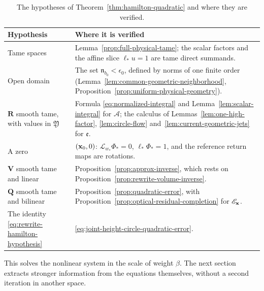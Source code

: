 \begin{table}[htbp]
\centering
\begin{tabularx}{\linewidth}{@{}lY@{}}
\toprule
Hypothesis & Where it is verified\\
\midrule
Tame spaces &
 Lemma~\ref{prop:full-physical-tame}; the scalar factors and the
 affine slice $\ell_*u=1$ are tame direct summands.\\
Open domain &
 The set $\mathfrak n_{b_0}<\epsilon_0$, defined by norms of one
 finite order
 (Lemma~\ref{lem:common-geometric-neighborhood},
 Proposition~\ref{prop:uniform-physical-geometry}).\\
$\mathbf R$ smooth tame, with values in $\mathfrak Y$ &
 Formula \eqref{eq:normalized-integral} and
 Lemma~\ref{lem:scalar-integral} for $\mathcal A$; the calculus of
 Lemmas~\ref{lem:one-high-factor}, \ref{lem:circle-flow}
 and~\ref{lem:current-geometric-jets} for $\mathfrak e$.\\
A zero &
 $(\mathbf x_0,0)$: $\mathscr L_{w_*}\Phi_*=0$, $\ell_*\Phi_*=1$, and the
 reference return maps are rotations.\\
$\mathbf V$ smooth tame and linear &
 Proposition~\ref{prop:approx-inverse}, which rests on
 Proposition~\ref{prop:rewrite-volume-inverse}.\\
$\mathbf Q$ smooth tame and bilinear &
 Proposition~\ref{prop:quadratic-error}, with
 Proposition~\ref{prop:optical-residual-completion} for
 $\mathscr E_{\mathbf x}$.\\
The identity \eqref{eq:rewrite-hamilton-hypothesis} &
 \eqref{eq:joint-height-circle-quadratic-error}.\\
\bottomrule
\end{tabularx}
\caption{The hypotheses of Theorem~\ref{thm:hamilton-quadratic} and
where they are verified.}
\label{tab:hamilton-hypotheses}
\end{table}


This solves the nonlinear system in the scale of weight $\beta$. The
next section extracts stronger information from the equations
themselves, without a second iteration in another space.
